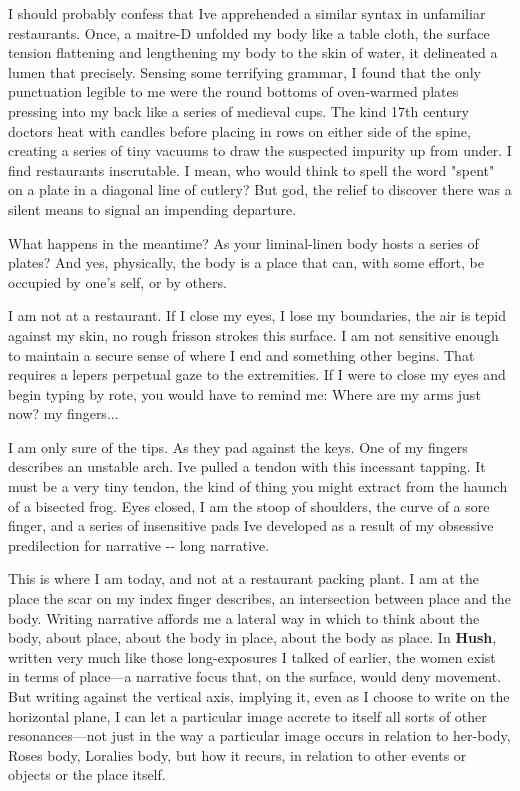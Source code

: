 I should probably confess that Ive apprehended a similar syntax in
unfamiliar restaurants. Once, a maitre-D unfolded my body like a table
cloth, the surface tension flattening and lengthening my body to the
skin of water, it delineated a lumen that precisely. Sensing some
terrifying grammar, I found that the only punctuation legible to me were
the round bottoms of oven-warmed plates pressing into my back like a
series of medieval cups. The kind 17th century doctors heat with candles
before placing in rows on either side of the spine, creating a series of
tiny vacuums to draw the suspected impurity up from under. I find
restaurants inscrutable. I mean, who would think to spell the word
"spent" on a plate in a diagonal line of cutlery? But god, the relief to
discover there was a silent means to signal an impending departure.

What happens in the meantime? As your liminal-linen body hosts a series
of plates? And yes, physically, the body is a place that can, with some
effort, be occupied by one's self, or by others.

I am not at a restaurant. If I close my eyes, I lose my boundaries, the
air is tepid against my skin, no rough frisson strokes this surface. I
am not sensitive enough to maintain a secure sense of where I end and
something other begins. That requires a lepers perpetual gaze to the
extremities. If I were to close my eyes and begin typing by rote, you
would have to remind me: Where are my arms just now? my fingers...

I am only sure of the tips. As they pad against the keys. One of my
fingers describes an unstable arch. Ive pulled a tendon with this
incessant tapping. It must be a very tiny tendon, the kind of thing you
might extract from the haunch of a bisected frog. Eyes closed, I am the
stoop of shoulders, the curve of a sore finger, and a series of
insensitive pads Ive developed as a result of my obsessive predilection
for narrative -\/- long narrative.

This is where I am today, and not at a restaurant packing plant. I am at
the place the scar on my index finger describes, an intersection between
place and the body. Writing narrative affords me a lateral way in which
to think about the body, about place, about the body in place, about the
body as place. In \textbf{Hush}, written very much like those
long-exposures I talked of earlier, the women exist in terms of
place---a narrative focus that, on the surface, would deny movement. But
writing against the vertical axis, implying it, even as I choose to
write on the horizontal plane, I can let a particular image accrete to
itself all sorts of other resonances---not just in the way a particular
image occurs in relation to her-body, Roses body, Loralies body, but how
it recurs, in relation to other events or objects or the place itself.

